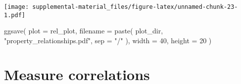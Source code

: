 \documentclass[
]{book}
\newenvironment{Shaded}{\begin{snugshade}}{\end{snugshade}}
\newcommand{\AttributeTok}[1]{\textcolor[rgb]{0.77,0.63,0.00}{#1}}
\newcommand{\DecValTok}[1]{\textcolor[rgb]{0.00,0.00,0.81}{#1}}
\newcommand{\FunctionTok}[1]{\textcolor[rgb]{0.00,0.00,0.00}{#1}}
\newcommand{\NormalTok}[1]{#1}
\newcommand{\StringTok}[1]{\textcolor[rgb]{0.31,0.60,0.02}{#1}}
\begin{document}
\texttt{[image: supplemental-material\_files/figure-latex/unnamed-chunk-23-1.pdf]}

\begin{Shaded}
\begin{Highlighting}[]
\FunctionTok{ggsave}\NormalTok{(}
  \AttributeTok{plot =}\NormalTok{ rel\_plot,}
  \AttributeTok{filename =} \FunctionTok{paste}\NormalTok{(}
\NormalTok{    plot\_dir,}
    \StringTok{"property\_relationships.pdf"}\NormalTok{,}
    \AttributeTok{sep =} \StringTok{"/"}
\NormalTok{  ),}
  \AttributeTok{width =} \DecValTok{40}\NormalTok{,}
  \AttributeTok{height =} \DecValTok{20}
\NormalTok{)}
\end{Highlighting}
\end{Shaded}

\hypertarget{measure-correlations}{%
\section{Measure correlations}\label{measure-correlations}}
\end{document}
